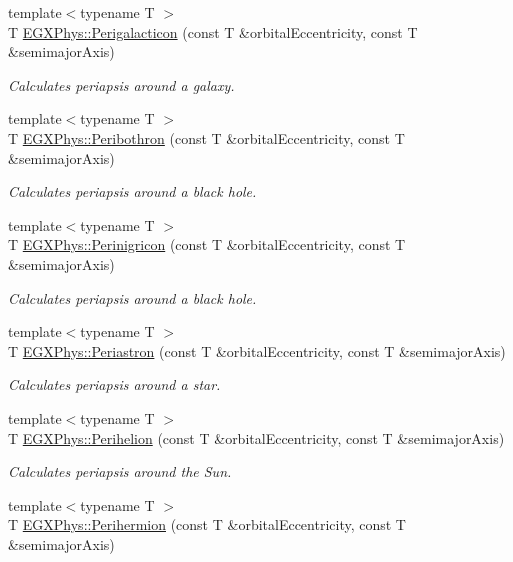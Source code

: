 \begin{DoxyCompactItemize}
{\footnotesize template$<$typename T $>$ }\\T \hyperlink{group___astrophysics_ga074fecab96b90bebffa512a37e52d90b}{E\+G\+X\+Phys\+::\+Perigalacticon} (const T \&orbital\+Eccentricity, const T \&semimajor\+Axis)
\begin{DoxyCompactList}\small\item\em Calculates periapsis around a galaxy. \end{DoxyCompactList}\item 
{\footnotesize template$<$typename T $>$ }\\T \hyperlink{group___astrophysics_gada5892309279a3a687c4eb2f88238e4e}{E\+G\+X\+Phys\+::\+Peribothron} (const T \&orbital\+Eccentricity, const T \&semimajor\+Axis)
\begin{DoxyCompactList}\small\item\em Calculates periapsis around a black hole. \end{DoxyCompactList}\item 
{\footnotesize template$<$typename T $>$ }\\T \hyperlink{group___astrophysics_ga99d86af90179994e17158b082c502fd4}{E\+G\+X\+Phys\+::\+Perinigricon} (const T \&orbital\+Eccentricity, const T \&semimajor\+Axis)
\begin{DoxyCompactList}\small\item\em Calculates periapsis around a black hole. \end{DoxyCompactList}\item 
{\footnotesize template$<$typename T $>$ }\\T \hyperlink{group___astrophysics_ga477de6824cbb5986cdae923141e21648}{E\+G\+X\+Phys\+::\+Periastron} (const T \&orbital\+Eccentricity, const T \&semimajor\+Axis)
\begin{DoxyCompactList}\small\item\em Calculates periapsis around a star. \end{DoxyCompactList}\item 
{\footnotesize template$<$typename T $>$ }\\T \hyperlink{group___astrophysics_ga941d285e3a0b48ada9c9f60925ff63c2}{E\+G\+X\+Phys\+::\+Perihelion} (const T \&orbital\+Eccentricity, const T \&semimajor\+Axis)
\begin{DoxyCompactList}\small\item\em Calculates periapsis around the Sun. \end{DoxyCompactList}\item 
{\footnotesize template$<$typename T $>$ }\\T \hyperlink{group___astrophysics_ga9562e9cbfd73019ae9cdaa643b843d63}{E\+G\+X\+Phys\+::\+Perihermion} (const T \&orbital\+Eccentricity, const T \&semimajor\+Axis)

\end{DoxyCompactItemize}
